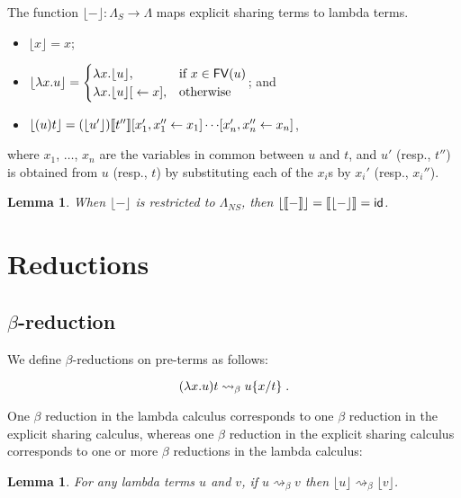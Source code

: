 \documentclass[10pt,a4paper]{article}
\theoremstyle{definition}
\theoremstyle{plain}
\newtheorem{lemma}[definition]{Lemma}
\theoremstyle{remark}
\begin{document}
\newcommand{\tercoden}[1]{{\lfloor{#1}\rfloor}}

The function $\tercoden{-}:\Lambda_S\rightarrow\Lambda$ maps explicit sharing terms to lambda terms.

\begin{itemize}
	\item $\tercoden{x}=x$;
	\item $\tercoden{\lambda x.u}=
	  \begin{cases}
	      \lambda x.\tercoden{u}, & \mbox{if }x\in\FV(u) \\
	      \lambda x.\ternullshare{\tercoden{u}}{x}, & \mbox{otherwise}
	  \end{cases}$; and
	\item $\tercoden{(u)t}=\terbishare{\terbishare{(\tercoden{u'})\terden{t''}}{x'_1}{x''_1}{x_1}\cdots}{x'_n}{x''_n}{x_n}$,
\end{itemize}
where $x_1$, $\dots$, $x_n$ are the variables in common between $u$ and $t$, and $u'$ (resp., $t''$) is obtained from $u$ (resp., $t$) by substituting each of the $x_i$s by $x_i'$ (resp., $x_i''$).

\begin{lemma}
 When $\tercoden{-}$ is restricted to $\Lambda_{NS}$, then $\tercoden{\terden{-}}=\terden{\tercoden{-}}=\mathsf{id}$.
\end{lemma}

\section{Reductions}

\subsection{$\beta$-reduction}

We define $\beta$-reductions on pre-terms as follows:

\[(\lambda x.u)t \rightsquigarrow_\beta { {u}\{{x}/{t}\} }\;.\]

One $\beta$ reduction in the lambda calculus corresponds to one $\beta$ reduction in the explicit sharing calculus, whereas one $\beta$ reduction in the explicit sharing calculus corresponds to one or more $\beta$ reductions in the lambda calculus:

\begin{lemma}
For any lambda terms $u$ and $v$, if $u\rightsquigarrow_\beta v$ then $\tercoden{u}\rightsquigarrow_\beta\tercoden{v}$.
\end{lemma}
\end{document}

